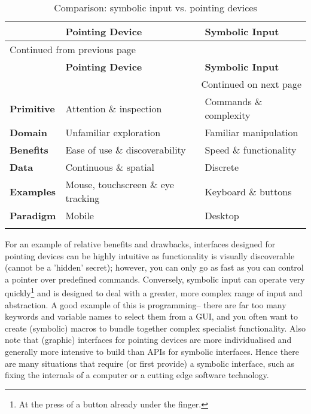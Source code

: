 \documentclass[logo,bsc,singlespacing,parskip]{infthesis}
\begin{document}
{\small %
{\renewcommand{\arraystretch}{1.2} %
\begin{longtable}{|p{2.0cm}|p{4.4cm}|p{4.4cm}|}
\hline
 & \textbf{Pointing Device} & \textbf{Symbolic Input}\\
\hline
\endfirsthead
\multicolumn{3}{l}{Continued from previous page} \\
\hline

 & \textbf{Pointing Device} & \textbf{Symbolic Input} \\

\hline
\endhead
\hline\multicolumn{3}{r}{Continued on next page} \\
\endfoot
\endlastfoot
\hline
\textbf{Primitive} & Attention \& inspection & Commands \& complexity\\
\hline
\textbf{Domain} & Unfamiliar exploration & Familiar manipulation\\
\hline
\textbf{Benefits} & Ease of use \& discoverability & Speed \& functionality\\
\hline
\textbf{Data} & Continuous \& spatial & Discrete\\
\hline
\textbf{Examples} & Mouse, touchscreen \& eye tracking & Keyboard \& buttons\\
\hline
\textbf{Paradigm} & Mobile & Desktop\\
\hline
\caption{\label{tab:pdsi}Comparison: symbolic input vs. pointing devices}
\\
\end{longtable}
}
}

For an example of relative benefits and drawbacks, interfaces designed for pointing devices can be highly intuitive as functionality is visually discoverable (cannot be a 'hidden' secret); however, you can only go as fast as you can control a pointer over predefined commands.
Conversely, symbolic input can operate very quickly\footnote{At the press of a button already under the finger.} and is designed to deal with a greater,
more complex range of input and abstraction.
A good example of this is programming-- there are far too many keywords and variable names to select them from a GUI, and you often want to create (symbolic) macros to bundle together complex specialist functionality.
Also note that (graphic) interfaces for pointing devices are more individualised and generally more intensive to build than APIs for symbolic interfaces.
Hence there are many situations that require (or first provide) a symbolic interface, such as fixing the internals of a computer or a cutting edge software technology.
\end{document}
